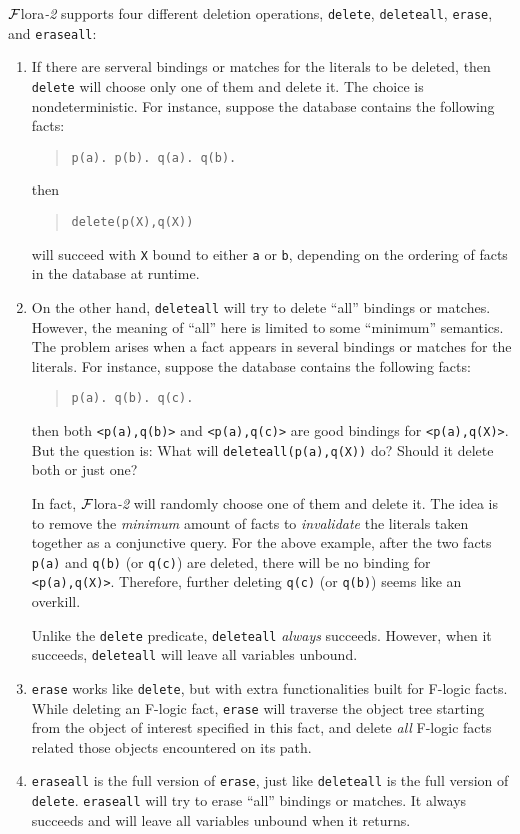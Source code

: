 \documentclass[11pt]{article}
\newcommand{\FLORA}{{\mbox{${\cal F}${\sc lora}\rm\emph{-2}}}\xspace}
\newcommand{\fl}{\mbox{F-logic}\xspace}
\begin{document}
\FLORA supports four different deletion operations, {\tt delete},
{\tt deleteall}, {\tt erase}, and {\tt eraseall}:
\begin{enumerate}
\item If there are serveral bindings or matches for
      the literals to be deleted, then {\tt delete} will choose only
      one of them and delete it. The choice is nondeterministic.
      For instance, suppose the database contains the following facts:
      \begin{quote}
      \verb|p(a). p(b). q(a). q(b).|
      \end{quote}
      then
      \begin{quote}
      \verb|delete(p(X),q(X))|
      \end{quote}
      will succeed with {\tt X} bound to either {\tt a} or {\tt b},
      depending on the ordering of facts in the database at runtime.

\item On the other hand, {\tt deleteall} will try to delete ``all''
      bindings or matches. However, the meaning of ``all'' here is
      limited to some ``minimum'' semantics. The problem arises when
      a fact appears in several bindings or matches for the literals.
      For instance, suppose the database contains the following facts:
      \begin{quote}
      \verb|p(a). q(b). q(c).|
      \end{quote}
      then both \verb|<p(a),q(b)>| and \verb|<p(a),q(c)>| are good
      bindings for \verb|<p(a),q(X)>|. But the question is: What will
      \verb|deleteall(p(a),q(X))| do? Should it delete both or just one?

      \smallskip

      In fact, \FLORA will randomly choose one of them and delete it.
      The idea is to remove the \emph{minimum} amount of facts to
      \emph{invalidate} the literals taken together as a conjunctive
      query. For the above example, after the two facts {\tt p(a)} and
      {\tt q(b)} (or {\tt q(c)}) are deleted, there will be no binding for
      \verb|<p(a),q(X)>|. Therefore, further deleting {\tt q(c)}
      (or {\tt q(b)}) seems like an overkill.

      \smallskip

      Unlike the {\tt delete} predicate, {\tt deleteall} \emph{always}
      succeeds. However, when it succeeds, {\tt deleteall} will leave
      all variables unbound.

\item {\tt erase} works like {\tt delete}, but with extra functionalities
      built for \fl facts. While deleting an \fl fact, {\tt erase}
      will traverse the object tree starting from the object of
      interest specified in this fact, and delete \emph{all} \fl facts
      related those objects encountered on its path.

\item {\tt eraseall} is the full version of {\tt erase}, just like {\tt deleteall}
      is the full version of {\tt delete}. {\tt eraseall} will try to erase
      ``all'' bindings or matches. It always succeeds and will leave all
      variables unbound when it returns.
\end{enumerate}
\end{document}

